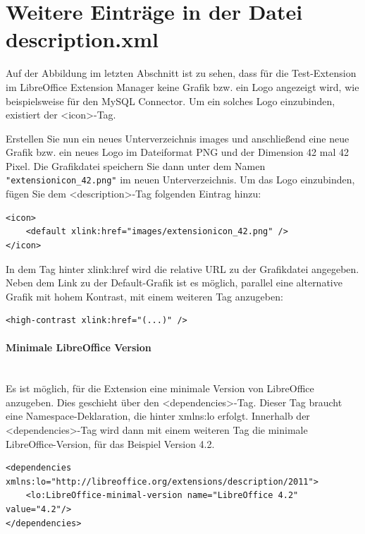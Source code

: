 \documentclass[a4paper,10pt,pagesize,titlepage]{scrbook}
\begin{document}
\section{Weitere Einträge in der Datei description.xml}

Auf der Abbildung im letzten Abschnitt ist zu sehen, dass für die Test-Extension im LibreOffice Extension Manager keine Grafik bzw. ein Logo angezeigt wird, wie beispielsweise für den MySQL Connector. Um ein solches Logo einzubinden, existiert der <icon>-Tag.

Erstellen Sie nun ein neues Unterverzeichnis \glqq images \grqq und anschließend eine neue Grafik bzw. ein neues Logo im Dateiformat PNG und der Dimension 42 mal 42 Pixel. Die Grafikdatei speichern Sie dann unter dem Namen \verb|"extensionicon_42.png"| im neuen Unterverzeichnis. Um das Logo einzubinden, fügen Sie dem <description>-Tag folgenden Eintrag hinzu:

\begin{lstlisting}
<icon>
    <default xlink:href="images/extensionicon_42.png" />
</icon>
\end{lstlisting}

In dem Tag hinter \glqq xlink:href \grqq wird die relative URL zu der Grafikdatei angegeben. Neben dem Link zu der Default-Grafik ist es möglich, parallel eine alternative Grafik mit hohem Kontrast, mit einem weiteren Tag anzugeben:
\begin{lstlisting}
<high-contrast xlink:href="(...)" />
\end{lstlisting}

\paragraph*{Minimale LibreOffice Version}$~~$\\

Es ist möglich, für die Extension eine minimale Version von LibreOffice anzugeben. Dies geschieht über den <dependencies>-Tag. Dieser Tag braucht eine Namespace-Deklaration, die hinter \glqq xmlns:lo \grqq erfolgt. Innerhalb der <dependencies>-Tag wird dann mit einem weiteren Tag die minimale LibreOffice-Version, für das Beispiel Version 4.2.

\begin{lstlisting}
<dependencies xmlns:lo="http://libreoffice.org/extensions/description/2011">
    <lo:LibreOffice-minimal-version name="LibreOffice 4.2" value="4.2"/>
</dependencies>
\end{lstlisting}
\end{document}
